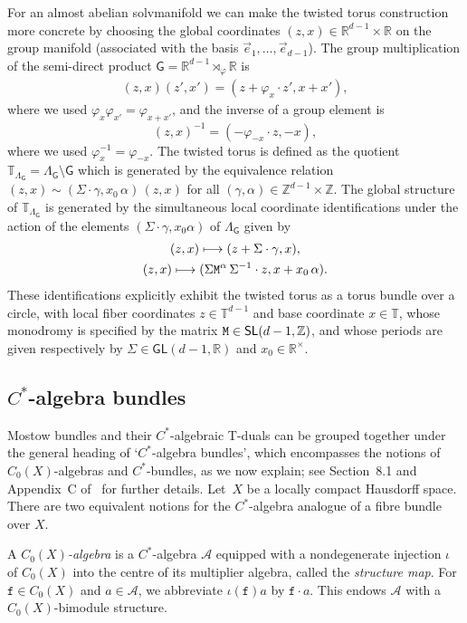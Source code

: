 \documentclass[11pt]{article}
\numberwithin{equation}{section}
\numberwithin{equation}{section}
\newcommand{\sfG}{\mathsf{G}}
\newcommand{\sfGL}{\mathsf{GL}}
\newcommand{\sfSL}{\mathsf{SL}}
\newcommand{\zed}{{\mathbb Z}} %
\newcommand{\real}{{\mathbb R}} %
\newcommand{\torus}{{\mathbb T}} %
\def\alg{{\mathcal A}}
\begin{document}
For an almost abelian solvmanifold we can make the twisted torus construction more concrete
by choosing the global
coordinates $(z,x)\in\real^{d-1}\times\real$ on the group
manifold (associated with the basis $\vec e_1,\ldots,\vec e_{d-1}$).
The group multiplication of the semi-direct product
$\sfG=\real^{d-1}\rtimes_\varphi\real$ is
\begin{gather}\label{eq:grouplaw}
(z,x) (z',x') = (z + \varphi_x\cdot z',x+x') ,
\end{gather}
where we used $\varphi_x \varphi_{x'} = \varphi_{x+x'}$, and the
inverse of a group element is
\[
(z,x)^{-1} = (-\varphi_{-x}\cdot z,-x) ,
\]
where we used $\varphi_x^{-1}=\varphi_{-x}$.
The twisted torus is defined as the quotient $\torus_{\Lambda_\sfG}=\Lambda_\sfG
{\setminus} \sfG$ which is generated by the equivalence relation $(z,x)\sim
(\Sigma\cdot\gamma,x_0\,\alpha)\,(z,x)$ for all $(\gamma,\alpha)\in\zed^{d-1}\times\zed$. The global structure
of $\torus_{\Lambda_{\sfG}}$ is generated by the simultaneous local coordinate
identifications under the action of the elements
$(\Sigma\cdot\gamma,x_0 \alpha) $ of $\Lambda_\sfG$ given by
\begin{gather}
(z,x) \longmapsto (
 z+\Sigma\cdot\gamma,x) , \nonumber \\
(z,x) \longmapsto (
\Sigma {\tt M}^\alpha\,\Sigma^{-1}\cdot z,x+x_0\,\alpha) .\label{eq:Mostowtorus}
\end{gather}
These identifications explicitly exhibit the twisted torus as a torus bundle over a circle, with
local fiber coordinates $z\in \torus^{d-1}$ and base coordinate $x\in \torus$,
 whose monodromy is specified by the matrix ${\tt M}\in
 \sfSL(d-1,\zed)$, and whose periods are given respectively by
 $\Sigma\in\sfGL(d-1,\real)$ and $x_0\in\real^\times$.

\subsection{$C^*$-algebra bundles}\label{sec:C*bundles}

Mostow bundles and their $C^*$-algebraic T-duals can be grouped together
under the general heading of `$C^*$-algebra bundles', which encompasses
the notions of $C_0(X)$-algebras and $C^*$-bundles, as we now
explain; see Section~8.1 and Appendix~C of~\cite{Williams2007} for
further details.
Let~$X$ be a locally compact Hausdorff space. There are two equivalent
notions for the $C^*$-algebra analogue of a fibre bundle over $X$.

A \emph{$C_0(X)$-algebra} is a $C^*$-algebra $\alg$
equipped with a nondegenerate injection $\iota$ of $C_0(X)$
into the centre of its multiplier algebra, called the \emph{structure
 map}. For $\mathtt{f}\in C_0(X)$ and
$a\in\alg$, we abbreviate $\iota(\mathtt{f})a$ by $\mathtt{f}\cdot a$. This endows
$\alg$ with a $C_0(X)$-bimodule
structure.
\end{document}
